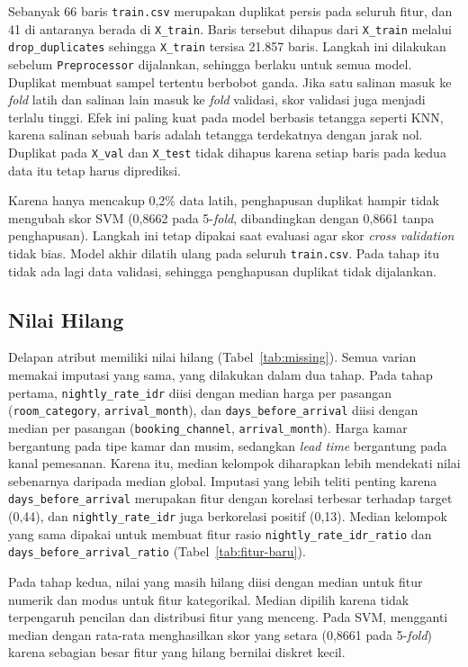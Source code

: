 Sebanyak 66 baris \texttt{train.csv} merupakan duplikat persis pada seluruh fitur,
dan 41 di antaranya berada di \texttt{X\_train}. Baris tersebut dihapus dari
\texttt{X\_train} melalui \texttt{drop\_duplicates} sehingga \texttt{X\_train}
tersisa 21.857 baris. Langkah ini dilakukan sebelum \texttt{Preprocessor}
dijalankan, sehingga berlaku untuk semua model. Duplikat membuat sampel tertentu
berbobot ganda. Jika satu salinan masuk ke \textit{fold} latih dan salinan lain
masuk ke \textit{fold} validasi, skor validasi juga menjadi terlalu tinggi. Efek
ini paling kuat pada model berbasis tetangga seperti KNN, karena salinan sebuah
baris adalah tetangga terdekatnya dengan jarak nol. Duplikat pada \texttt{X\_val}
dan \texttt{X\_test} tidak dihapus karena setiap baris pada kedua data itu tetap
harus diprediksi.

Karena hanya mencakup 0,2\% data latih, penghapusan duplikat hampir tidak
mengubah skor SVM (0,8662 pada 5-\textit{fold}, dibandingkan dengan 0,8661 tanpa
penghapusan). Langkah ini tetap dipakai saat evaluasi agar skor
\textit{cross validation} tidak bias. Model akhir dilatih ulang pada seluruh
\texttt{train.csv}. Pada tahap itu tidak ada lagi data validasi, sehingga
penghapusan duplikat tidak dijalankan.

\subsection{Nilai Hilang}

Delapan atribut memiliki nilai hilang (Tabel~\ref{tab:missing}). Semua varian
memakai imputasi yang sama, yang dilakukan dalam dua tahap. Pada tahap pertama,
\texttt{nightly\_rate\_idr} diisi dengan median harga per pasangan
(\texttt{room\_category}, \texttt{arrival\_month}), dan
\texttt{days\_before\_arrival} diisi dengan median per pasangan
(\texttt{booking\_channel}, \texttt{arrival\_month}). Harga kamar bergantung pada
tipe kamar dan musim, sedangkan \textit{lead time} bergantung pada kanal
pemesanan. Karena itu, median kelompok diharapkan lebih mendekati nilai
sebenarnya daripada median global. Imputasi yang lebih teliti penting karena
\texttt{days\_before\_arrival} merupakan fitur dengan korelasi terbesar terhadap
target (0,44), dan \texttt{nightly\_rate\_idr} juga berkorelasi positif (0,13).
Median kelompok yang sama dipakai untuk membuat fitur rasio
\texttt{nightly\_rate\_idr\_ratio} dan \texttt{days\_before\_arrival\_ratio}
(Tabel~\ref{tab:fitur-baru}).

Pada tahap kedua, nilai yang masih hilang diisi dengan median untuk fitur numerik
dan modus untuk fitur kategorikal. Median dipilih karena tidak terpengaruh
pencilan dan distribusi fitur yang menceng. Pada SVM, mengganti median dengan
rata-rata menghasilkan skor yang setara (0,8661 pada 5-\textit{fold}) karena
sebagian besar fitur yang hilang bernilai diskret kecil.

